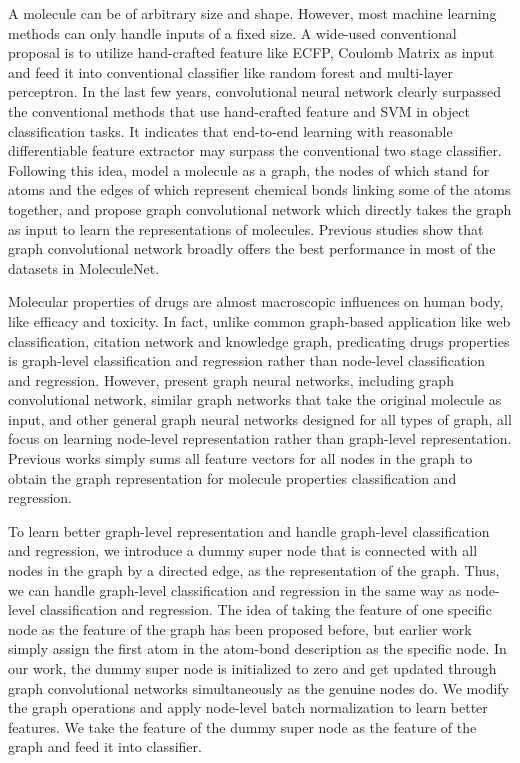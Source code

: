 \documentclass[letterpaper]{article} \usepackage{aaai18}  \usepackage{times}  \usepackage{helvet}  \usepackage{courier}  \usepackage{url}  \usepackage{graphicx}  \usepackage{amsmath}
\begin{document}
A molecule can be of arbitrary size and shape. However, most machine learning methods can only handle inputs of a fixed size. A wide-used conventional proposal is to utilize hand-crafted feature like ECFP\cite{rogers2010extended}, Coulomb Matrix\cite{rupp2012fast} as input and feed it into conventional classifier like random forest and multi-layer perceptron. In the last few years, convolutional neural network clearly surpassed the conventional methods that use hand-crafted feature and SVM in object classification tasks\cite{krizhevsky2012imagenet}. It indicates that end-to-end learning with reasonable differentiable feature extractor may surpass the conventional two stage classifier. Following this idea, \cite{duvenaud2015convolutional} model a molecule as a graph, the nodes of which stand for atoms and the edges of which represent chemical bonds linking some of the atoms together, and propose graph convolutional network which directly takes the graph as input to learn the representations of molecules. Previous studies show that graph convolutional network broadly offers the best performance in most of the datasets in MoleculeNet\cite{wu2017moleculenet}.

Molecular properties of drugs are almost macroscopic influences on human body, like efficacy and toxicity. In fact, unlike common graph-based application like web classification, citation network and knowledge graph, predicating drugs properties is graph-level classification and regression rather than node-level classification and regression. However, present graph neural networks, including graph convolutional network\cite{duvenaud2015convolutional}, similar graph networks that take the original molecule as input\cite{altae2017low,yao2017intrinsic,schutt2017quantum,gomes2017atomic}, and other general graph neural networks designed for all types of graph\cite{li2015gated,bruna2013spectral,defferrard2016convolutional,kipf2016semi,niepert2016learning}, all focus on learning node-level representation rather than graph-level representation. Previous works \cite{altae2017low,wu2017moleculenet} simply sums all feature vectors for all nodes in the graph to obtain the graph representation for molecule properties classification and regression. 

To learn better graph-level representation and handle graph-level classification and regression, we introduce a dummy super node that is connected with all nodes in the graph by a directed edge, as the representation of the graph. Thus, we can handle graph-level classification and regression in the same way as node-level classification and regression. The idea of taking the feature of one specific node as the feature of the graph has been proposed before\cite{scarselli2009graph}, but earlier work simply assign the first atom in the atom-bond description as the specific node. In our work, the dummy super node is initialized to zero and get updated through graph convolutional networks simultaneously as the genuine nodes do. We modify the graph operations\cite{altae2017low} and apply node-level batch normalization to learn better features.
We take the feature of the dummy super node as the feature of the graph and feed it into classifier. 
\end{document}
